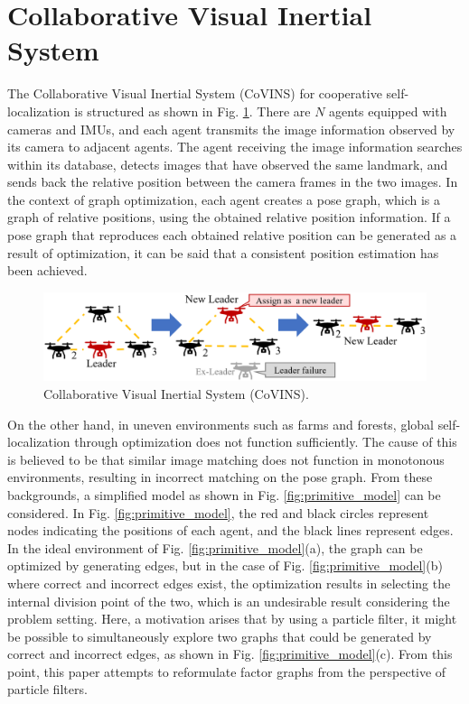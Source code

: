 \documentclass[a4paper,fleqn,10pt,twocolumn]{SICE_ISCS}
\begin{document}
\section{Collaborative Visual Inertial System}
The Collaborative Visual Inertial System (CoVINS) for cooperative self-localization is structured as shown in Fig. \ref{fig:covins}. There are $N$ agents equipped with cameras and IMUs, and each agent transmits the image information observed by its camera to adjacent agents. The agent receiving the image information searches within its database, detects images that have observed the same landmark, and sends back the relative position between the camera frames in the two images. In the context of graph optimization, each agent creates a pose graph, which is a graph of relative positions, using the obtained relative position information\cite{Factor-Graphs}. If a pose graph that reproduces each obtained relative position can be generated as a result of optimization, it can be said that a consistent position estimation has been achieved.

\begin{figure}[t]
	\begin{center}
		\includegraphics[width=\linewidth]{Fig/Nice_image_fault.eps}
		\caption{Collaborative Visual Inertial System (CoVINS).}
		\label{fig:covins}
	\end{center}
	\vspace{-2mm}
\end{figure}

On the other hand, in uneven environments such as farms and forests, global self-localization through optimization does not function sufficiently. The cause of this is believed to be that similar image matching does not function in monotonous environments, resulting in incorrect matching on the pose graph. From these backgrounds, a simplified model as shown in Fig. \ref{fig:primitive_model} can be considered. In Fig. \ref{fig:primitive_model}, the red and black circles represent nodes indicating the positions of each agent, and the black lines represent edges. In the ideal environment of Fig. \ref{fig:primitive_model}(a), the graph can be optimized by generating edges, but in the case of Fig. \ref{fig:primitive_model}(b) where correct and incorrect edges exist, the optimization results in selecting the internal division point of the two, which is an undesirable result considering the problem setting. Here, a motivation arises that by using a particle filter, it might be possible to simultaneously explore two graphs that could be generated by correct and incorrect edges, as shown in Fig. \ref{fig:primitive_model}(c). From this point, this paper attempts to reformulate factor graphs from the perspective of particle filters.
\end{document}
